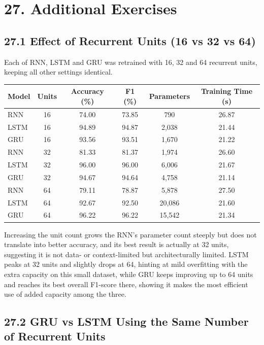 \documentclass[10pt]{article}
\begin{document}
\section*{27. Additional Exercises}

\subsection*{27.1 Effect of Recurrent Units (16 vs 32 vs 64)}

Each of RNN, LSTM and GRU was retrained with 16, 32 and 64 recurrent units, keeping all other settings identical.

\begin{center}
\begin{tabular}{|l|c|c|c|c|c|}
\hline
Model & Units & Accuracy (\%) & F1 (\%) & Parameters & Training Time (s)\\
\hline
RNN & 16 & 74.00 & 73.85 & 790 & 26.87\\
LSTM & 16 & 94.89 & 94.87 & 2{,}038 & 21.44\\
GRU & 16 & 93.56 & 93.51 & 1{,}670 & 21.22\\
RNN & 32 & 81.33 & 81.37 & 1{,}974 & 26.60\\
LSTM & 32 & 96.00 & 96.00 & 6{,}006 & 21.67\\
GRU & 32 & 94.67 & 94.64 & 4{,}758 & 21.14\\
RNN & 64 & 79.11 & 78.87 & 5{,}878 & 27.50\\
LSTM & 64 & 92.67 & 92.50 & 20{,}086 & 21.60\\
GRU & 64 & 96.22 & 96.22 & 15{,}542 & 21.34\\
\hline
\end{tabular}
\end{center}

Increasing the unit count grows the RNN's parameter count steeply but does not translate into better accuracy, and its best result is actually at 32 units, suggesting it is not data- or context-limited but architecturally limited. LSTM peaks at 32 units and slightly drops at 64, hinting at mild overfitting with the extra capacity on this small dataset, while GRU keeps improving up to 64 units and reaches its best overall F1-score there, showing it makes the most efficient use of added capacity among the three.

\subsection*{27.2 GRU vs LSTM Using the Same Number of Recurrent Units}
\end{document}
